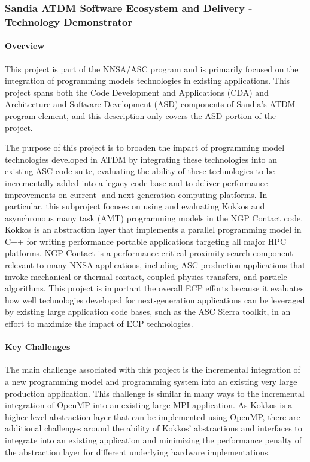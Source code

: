 \subsubsection{ Sandia ATDM Software Ecosystem and Delivery -
  Technology Demonstrator} 

\paragraph{Overview} 

This project is part of the NNSA/ASC program and is primarily focused
on the integration of programming models technologies in existing
applications. This project spans both the Code Development and
Applications (CDA) and Architecture and Software Development (ASD)
components of Sandia's ATDM program element, and this description only
covers the ASD portion of the project.

The purpose of this project is to broaden the impact of
programming model technologies developed in ATDM by integrating these
technologies into an existing ASC code suite, evaluating the ability
of these technologies to be incrementally added into a legacy code
base and to deliver performance improvements on current- and
next-generation computing platforms. In particular, this subproject
focuses on using and evaluating Kokkos and asynchronous many task
(AMT) programming models in the NGP Contact code. Kokkos is an
abstraction layer that implements a parallel programming model in C++
for writing performance portable applications targeting all major HPC
platforms. NGP Contact is a performance-critical proximity search
component relevant to many NNSA applications, including ASC production
applications that invoke mechanical or thermal contact, coupled
physics transfers, and particle algorithms. This project is important
the overall ECP efforts because it evaluates how well technologies
developed for next-generation applications can be leveraged by
existing large application code bases, such as the ASC Sierra toolkit,
in an effort to maximize the impact of ECP technologies. 

\paragraph{Key  Challenges}

The main challenge associated with this project is the incremental
integration of a new programming model and programming system into an
existing very large production application. This challenge is similar
in many ways to the incremental integration of OpenMP into an existing
large MPI application. As Kokkos is a higher-level abstraction layer
that can be implemented using OpenMP, there are additional challenges
around the ability of Kokkos' abstractions and interfaces to integrate
into an existing application and minimizing the performance penalty of
the abstraction layer for different underlying hardware
implementations.


